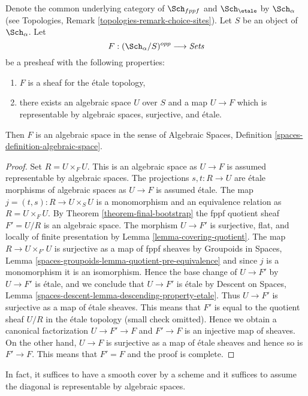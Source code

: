 \begin{lemma}
\label{lemma-spaces-etale-locally-representable}
Denote the common underlying category of $\Sch_{fppf}$ and $\Sch_\etale$ by
$\Sch_\alpha$ (see Topologies, Remark \ref{topologies-remark-choice-sites}).
Let $S$ be an object of $\Sch_\alpha$. Let
$$
F : (\Sch_\alpha/S)^{opp} \longrightarrow \textit{Sets}
$$
be a presheaf with the following properties:
\begin{enumerate}
\item $F$ is a sheaf for the \'etale topology,
\item there exists an algebraic space $U$ over $S$
and a map $U \to F$ which is representable by
algebraic spaces, surjective, and \'etale.
\end{enumerate}
Then $F$ is an algebraic space in the sense of
Algebraic Spaces, Definition \ref{spaces-definition-algebraic-space}.
\end{lemma}

\begin{proof}
Set $R = U \times_F U$. This is an algebraic space as $U \to F$ is assumed
representable by algebraic spaces. The projections $s, t : R \to U$ are
\'etale morphisms of algebraic spaces as $U \to F$ is assumed \'etale.
The map $j = (t, s) : R \to U \times_S U$ is a monomorphism and an
equivalence relation as $R = U \times_F U$. By
Theorem \ref{theorem-final-bootstrap}
the fppf quotient sheaf $F' = U/R$ is an algebraic space.
The morphism $U \to F'$ is surjective, flat, and locally of finite
presentation by Lemma \ref{lemma-covering-quotient}.
The map $R \to U \times_{F'} U$ is surjective as a map of fppf
sheaves by Groupoids in Spaces, Lemma
\ref{spaces-groupoids-lemma-quotient-pre-equivalence}
and since $j$ is a monomorphism it is an isomorphism.
Hence the base change of $U \to F'$ by $U \to F'$ is \'etale,
and we conclude that $U \to F'$ is \'etale by
Descent on Spaces, Lemma \ref{spaces-descent-lemma-descending-property-etale}.
Thus $U \to F'$ is surjective as a map of \'etale sheaves.
This means that $F'$ is equal to the quotient sheaf $U/R$
in the \'etale topology (small check omitted). Hence we obtain
a canonical factorization $U \to F' \to F$ and $F' \to F$ is an injective
map of sheaves. On the other hand, $U \to F$ is surjective as a map
of \'etale sheaves and hence so is $F' \to F$. This means that $F' = F$
and the proof is complete.
\end{proof}

\noindent
In fact, it suffices to have a smooth cover by a scheme and it suffices
to assume the diagonal is representable by algebraic spaces.

